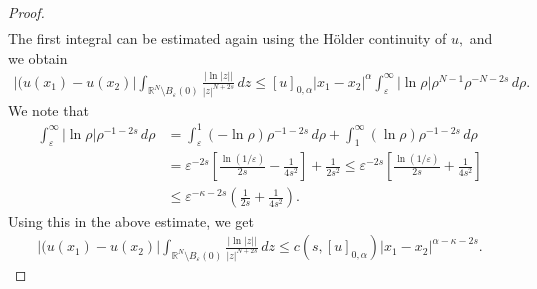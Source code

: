 \documentclass[10pt,a4paper]{amsart}
\newcommand{\RR}{\mathds{R}}
\begin{document}
\begin{proof}
\begin{align*}
\end{align*} 
The first integral can be estimated again using the H\"{o}lder continuity of $u,$ and we obtain
\begin{align*}
 |(u(x_1)-u(x_2)|\int_{\RR^N\setminus B_{\varepsilon}(0)}\frac{|\ln |z||}{|z|^{N+2s}}\, dz\leq [u]_{0, \alpha}|x_1-x_2|^{\alpha} \int_{\varepsilon}^{\infty}|\ln \rho|\rho^{N-1}\rho^{-N-2s}\, d\rho.  
\end{align*}
We note that
\begin{align*}
    \int_{\varepsilon}^{\infty} |\ln \rho|\rho^{-1-2s}\, d\rho&=\int_{\varepsilon}^{1} (-\ln \rho)\rho^{-1-2s}\, d\rho+ \int_{1}^{\infty}  (\ln \rho)\rho^{-1-2s}\, d\rho\\
    &=\varepsilon^{-2s}\left[\frac{\ln (1/\varepsilon)}{2s}-\frac{1}{4s^2}\right]+\frac{1}{2s^2}\leq \varepsilon^{-2s}\left[\frac{\ln (1/\varepsilon)}{2s}+\frac{1}{4s^2}\right]\\
    &\leq \varepsilon^{-\kappa-2s}\left(\frac{1}{2s}+\frac{1}{4s^2}\right).
\end{align*}
Using this in the above estimate, we get
\begin{align*}
|(u(x_1)-u(x_2)|\int_{\RR^N\setminus B_{\varepsilon}(0)}\frac{|\ln |z||}{|z|^{N+2s}}\, dz \leq c(s, [u]_{0, \alpha})|x_1-x_2|^{\alpha-\kappa-2s}.    
\end{align*}


\end{proof}
\end{document}
